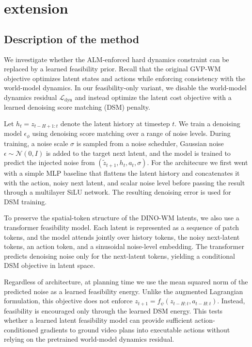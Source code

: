 \section{extension}
\subsection{Description of the method}
We investigate whether the ALM-enforced hard dynamics constraint can be replaced by a learned feasibility prior. 
Recall that the original GVP-WM objective optimizes latent states and actions while enforcing consistency with the world-model dynamics. 
In our feasibility-only variant, we disable the world-model dynamics residual $\mathcal{L}_{\mathrm{dyn}}$ and instead optimize the latent cost objective with a learned denoising score matching (DSM) penalty.



Let \(h_t = z_{t-H+1:t}\) denote the latent history at timestep \(t\). We train a denoising model $\epsilon_\phi$ using denoising score matching over a range of noise levels. During training, a noise scale $\sigma$ is sampled from a noise scheduler, Gaussian noise $\epsilon \sim \mathcal{N}(0,I)$ is added to the target next latent, and the model is trained to predict the injected noise from $(\tilde{z}_{t+1}, h_t, a_t, \sigma)$. 
For the architecure we first went with a simple MLP baseline that flattens the latent history and concatenates it with the action, noisy next latent, and scalar noise level before passing the result through a multilayer SiLU network. The resulting denoising error is used for DSM training.

To preserve the spatial-token structure of the DINO-WM latents, we also use a transformer feasibility model. Each latent is represented as a sequence of patch tokens, and the model attends jointly over history tokens, the noisy next-latent tokens, an action token, and a sinusoidal noise-level embedding. The transformer predicts denoising noise only for the next-latent tokens, yielding a conditional DSM objective in latent space.

Regardless of architecture, at planning time we use the mean squared norm of the predicted noise as a learned feasibility energy. Unlike the augmented Lagrangian formulation, this objective does not enforce
\(
z_{t+1} = f_\psi(z_{t-H:t}, a_{t-H:t}).
\)
Instead, feasibility is encouraged only through the learned DSM energy. 
This tests whether a learned latent feasibility model can provide sufficient action-conditioned gradients to ground video plans into executable actions without relying on the pretrained world-model dynamics residual.

